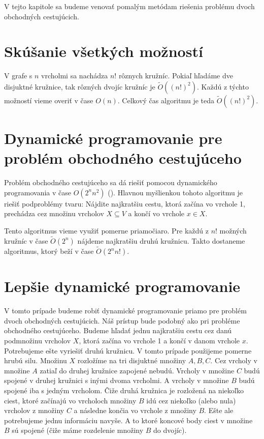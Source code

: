 V tejto kapitole sa budeme venovať pomalým metódam riešenia problému
dvoch obchodných cestujúcich.

\section{Skúšanie všetkých možností}

V grafe s $n$ vrcholmi sa nachádza $n!$ rôznych kružníc. Pokiaľ hľadáme
dve disjuktné kružnice, tak rôzných dvojíc kružníc je $\tilde{O}((n!)^2)$.
Každú z týchto možností vieme overiť v čase $O(n)$. Celkový čas algoritmu
je teda $\tilde{O}((n!)^2)$.

\section{Dynamické programovanie pre problém obchodného cestujúceho}

Problém obchodného cestujúceho sa dá riešiť pomocou dynamického
programovania v čase $O(2^n n^2)$ (\cite{Held}). Hlavnou myšlienkou
tohoto algoritmu je riešiť podproblémy tvaru: Nájdite najkratšiu cestu, ktorá
začína vo vrchole 1, prechádza cez množinu vrcholov $X \subseteq V$ a končí vo vrchole
$x \in X$.

Tento algoritmus vieme využiť pomerne priamočiaro. Pre každú z $n!$ možných kružníc
v čase $\tilde{O}(2^n)$ nájdeme najkratšiu druhú kružnicu. Takto dostaneme
algoritmus, ktorý beží v čase $\tilde{O}(2^n n!)$. 

\section{Lepšie dynamické programovanie}

V tomto prípade budeme robiť dynamické programovanie priamo pre problém
dvoch obchodných cestujúcich. Náš prístup bude podobný ako pri probléme
obchodného cestujúceho. 
Budeme hľadať jednu najkratšiu cestu cez danú podmnožinu vrcholov
$X$, ktorá začína vo vrchole 1 a končí v danom vrchole $x$. Potrebujeme ešte vyriešiť
druhú kružnicu. V tomto prípade použijeme pomerne hrubú silu.
Množinu $X$ rozložíme na tri disjuktné množiny $A, B, C$.
Cez vrcholy v množine $A$ zatiaľ do druhej kružnice zapojené nebudú. Vrcholy v množine
$C$ budú spojené v druhej kružnici s inými dvoma vrcholmi.
A vrcholy v množine $B$ budú spojené iba s jedným vrcholom. Čiže druhá kružnica je
rozložená na niekoľko ciest, ktoré začínajú vo vrcholoch množiny $B$ idú cez niekoľko
(alebo nula) vrcholov z množiny $C$ a následne končia vo vrchole z množiny $B$.
Ešte ale potrebujeme jednu informáciu navyše. A to ktoré koncové body ciest v množine
$B$ sú spojené (čiže máme rozdelenie množiny $B$ do dvojíc).

